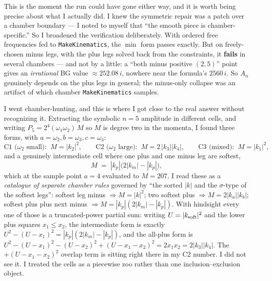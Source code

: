 \documentclass{article}
\begin{document}
This is the moment the run could have gone either way, and it is worth being
precise about what I actually did. I knew the symmetric repair was a patch over a
chamber boundary --- I noted to myself that ``the smooth piece is
chamber-specific.'' So I broadened the verification deliberately. With ordered
free frequencies fed to \texttt{MakeKinematics}, the $\min$ form passes exactly.
But on freely-chosen minus legs, with the plus legs solved back from the
constraints, it \textbf{fails} in several chambers --- and not by a little: a
``both minus positive $(2,5)$'' point gives an \emph{irrational} BG value
$\approx252.08\,i$, nowhere near the formula's $2560\,i$. So $A_n$ genuinely
depends on the plus legs in general; the minus-only collapse was an artifact of
which chamber \texttt{MakeKinematics} samples.

I went chamber-hunting, and this is where I got close to the real answer without
recognizing it. Extracting the symbolic $n=5$ amplitude in different cells, and
writing $P_5=2^{4}(\omega_1\omega_2)\,M$ so $M$ is degree two in the momenta, I
found three forms, with $a=\omega_2,b=\omega_3,c=\omega_4$:
\[
\text{C1 ($\omega_2$ small):}\;\; M=|k_2|^2,\qquad
\text{C2 ($\omega_2$ large):}\;\; M=2\,|k_3||k_4|,\qquad
\text{C3 (mixed):}\;\; M=|k_1|^2,
\]
and a genuinely intermediate cell where one plus and one minus leg are softest,
\[
M \;=\; |k_p|\big(2|k_m|-|k_p|\big),
\]
which at the sample point $a=4$ evaluated to $M=207$. I read these as a
\emph{catalogue of separate chamber rules} governed by ``the sorted $|k|$ and the
$\sigma$-type of the softest legs'': softest leg minus $\Rightarrow M=|k|^2$; two
softest plus $\Rightarrow M=2|k_a||k_b|$; softest plus plus next minus
$\Rightarrow M=|k_p|(2|k_m|-|k_p|)$. With hindsight every one of those is a
truncated-power partial sum: writing $U=|k_{\rm soft}|^2$ and the lower plus
squares $x_1\le x_2$, the intermediate form is exactly
$U^2-(U-x_1)^2=|k_p|(2|k_m|-|k_p|)$, and the all-plus form is
$U^2-(U-x_1)^2-(U-x_2)^2+(U-x_1-x_2)^2=2x_1x_2=2|k_3||k_4|$. The
$+(U-x_1-x_2)^2$ overlap term is sitting right there in my C2 number. I did not
see it. I treated the cells as a piecewise zoo rather than one inclusion--exclusion
object.
\end{document}
